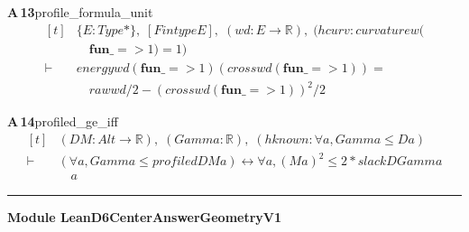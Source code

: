 \documentclass[conference]{IEEEtran}
\theoremstyle{definition}
\newcommand{\lean}[1]{\textsf{\footnotesize #1}}
\begin{document}
\noindent\textbf{A\,13}\quad\lean{profile\_formula\_unit}
{\footnotesize\[ \begin{aligned}[t]
&\{ \mathit{E} : \mathit{Type}*\},\; [\mathit{Fintype} \mathit{E}],\; (\mathit{w} \mathit{d} : \mathit{E} \to \mathbb{R} ),\; (\mathit{hcurv} : \mathit{curvature} \mathit{w} (\\
&\quad \mathbf{fun} \mathit{\_} => 1) = 1)\\
\vdash\;&\mathit{energy} \mathit{w} \mathit{d} (\mathbf{fun} \mathit{\_} => 1) (\mathit{cross} \mathit{w} \mathit{d} (\mathbf{fun} \mathit{\_} => 1)) =\\
&\quad \mathit{raw} \mathit{w} \mathit{d} / 2 - (\mathit{cross} \mathit{w} \mathit{d} (\mathbf{fun} \mathit{\_} => 1))^{2} / 2
\end{aligned} \]}

\noindent\textbf{A\,14}\quad\lean{profiled\_ge\_iff}
{\footnotesize\[ \begin{aligned}[t]
&(\mathit{D} \mathit{M} : \mathit{Alt} \to \mathbb{R} ),\; (\mathit{Gamma} : \mathbb{R} ),\; (\mathit{hknown} : \forall \mathit{a}, \mathit{Gamma} \leq \mathit{D} \mathit{a})\\
\vdash\;&(\forall \mathit{a}, \mathit{Gamma} \leq \mathit{profiled} \mathit{D} \mathit{M} \mathit{a}) \leftrightarrow \forall \mathit{a}, (\mathit{M} \mathit{a})^{2} \leq 2 * \mathit{slack} \mathit{D} \mathit{Gamma}\\
&\quad \mathit{a}
\end{aligned} \]}

\vspace{4pt}\noindent\rule{\columnwidth}{0.4pt}\par\vspace{2pt}
\noindent\textbf{Module \lean{LeanD6CenterAnswerGeometryV1}}\par\vspace{3pt}
\end{document}
